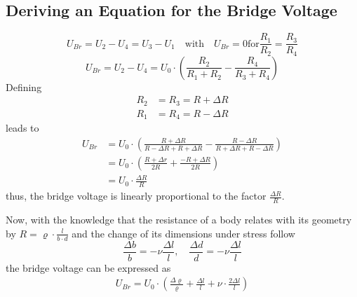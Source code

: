         \subsection{Deriving an Equation for the Bridge Voltage}\label{sec:A4 equation for full bridge circuit}%
            \begin{equation}
                U_{Br} = U_2 - U_4 = U_3 - U_1 \quad \text{with} \quad U_{Br} = 0 \text{for} \frac{R_1}{R_2} = \frac{R_3}{R_4}
            \end{equation}
            \begin{equation}
                U_{Br} = U_2 - U_4 = U_0 \cdot \left(\frac{R_2}{R_1 + R_2} - \frac{R_4}{R_3 + R_4}\right)
            \end{equation}
            Defining
            \begin{align}
                R_2 &= R_3 = R + \Delta R \\
                R_1 &= R_4 = R - \Delta R
            \end{align}
            leads to
            \begin{align}
                U_{Br}  &= U_0 \cdot \left(\frac{R + \Delta R}{R - \Delta R + R + \Delta R} - \frac{R - \Delta R}{R + \Delta R + R - \Delta R}\right) \nonumber \\
                        &= U_0 \cdot \left(\frac{R+\Delta r}{2R} + \frac{-R + \Delta R}{2R}\right) \nonumber \\
                        &= U_0 \cdot \frac{\Delta R}{R}
                \label{eq:Ubr and delta R}
            \end{align}
            thus, the bridge voltage is linearly proportional to the factor \( \frac{\Delta R}{R} \).\par
            Now, with the knowledge that the resistance of a body relates with its geometry by
            \( R = \varrho \cdot \frac{l}{b \cdot d} \) and the change of its dimensions under stress follow
            \begin{equation}
                \frac{\Delta b}{b} = -\nu \frac{\Delta l}{l}, \quad \frac{\Delta d}{d} = -\nu \frac{\Delta l}{l}
            \end{equation}
            the bridge voltage can be expressed as
            \begin{align}
                U_{Br} = U_0 \cdot \left( \frac{\Delta \varrho}{\varrho} + \frac{\Delta l}{l} + \nu \cdot \frac{2 \Delta l}{l}\right)
            \end{align}
